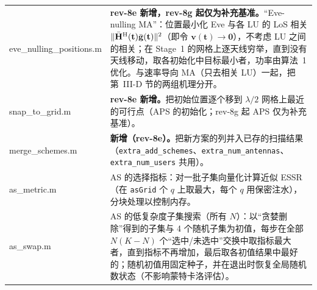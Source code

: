 \documentclass[11pt,a4paper]{ctexart}
\newcommand{\code}[1]{\texttt{#1}}
\begin{document}
\begin{longtable}{>{\ttfamily\small}p{4.6cm}p{11.2cm}}
eve\_nulling\_positions.m & \textbf{rev-8e 新增，rev-8g 起仅为补充基准。}“Eve-nulling MA”：位置最小化 Eve 与各 LU 的 LoS 相关 $\|\bar{\mathbf H}^{\rm H}(\mathbf t)\bar{\mathbf g}(\mathbf t)\|^2$（即令 $\mathbf v(\mathbf t)\to\mathbf 0$），不考虑 LU 之间的相关；在 Stage~1 的网格上逐天线穷举，直到没有天线移动，取各初始化中目标最小者，功率由算法~1 优化。与速率导向 MA（只去相关 LU）一起，把第~III-D 节的两组机理分开。\\
snap\_to\_grid.m & \textbf{rev-8e 新增。}把初始位置逐个移到 $\lambda/2$ 网格上最近的可行点（APS 的初始化；rev-8g 起 APS 仅为补充基准）。\\
merge\_schemes.m & \textbf{新增（rev-8e）。}把新方案的列并入已存的扫描结果（\code{extra\_add\_schemes}、\code{extra\_num\_antennas}、\code{extra\_num\_users} 共用）。\\
as\_metric.m & AS 的选择指标：对一批子集向量化计算近似 ESSR（在 \code{asGrid} 个 $q$ 上取最大，每个 $q$ 用保密注水），分块处理以控制内存。\\
as\_swap.m & AS 的低复杂度子集搜索（所有 $N$）：以“贪婪删除”得到的子集与 4 个随机子集为初值，每步在全部 $N(K-N)$ 个“选中/未选中”交换中取指标最大者，直到指标不再增加，最后取各初值结果中最好的；随机初值用固定种子，并在退出时恢复全局随机数状态（不影响蒙特卡洛评估）。\\
\bottomrule
\end{longtable}
\end{document}
